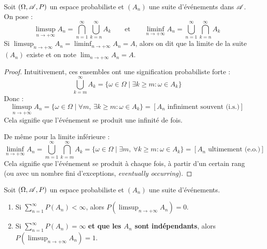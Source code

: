 \begin{proposition}
    Soit $(\Omega, \mathscr{A}, P)$ un espace probabiliste et $(A_n)$ une suite d'événements dans $\mathscr{A}$. On pose :
    \[
    \limsup_{n\to+\infty} A_n = \bigcap_{n=1}^\infty \bigcup_{k = n}^\infty A_k \qquad \text{et} \qquad \liminf_{n\to+\infty} A_n = \bigcup_{n=1}^\infty \bigcap_{k = n}^\infty A_k
    \]
    Si $\limsup_{n\to +\infty}A_n = \liminf_{n\to +\infty}A_n = A$, alors on dit que la limite de la suite $(A_n)$ existe et on note $\lim_{n\to +\infty}A_n = A$.
\end{proposition}

\begin{proof}
   Intuitivement, ces ensembles ont une signification probabiliste forte :
    \[
    \bigcup_{k=m}^{\infty} A_k = \{\omega \in \Omega \mid \exists k \geq m : \omega \in A_k\}
    \]
    Donc :
    \[
    \limsup_{n \to +\infty} A_n = \{\omega \in \Omega \mid \forall m,\ \exists k \geq m : \omega \in A_k\} = [A_n \text{ infiniment souvent (i.s.)}]
    \]
    Cela signifie que l'événement se produit une infinité de fois.
    
    De même pour la limite inférieure :
    \[
    \liminf_{n \to +\infty} A_n = \bigcup_{m=1}^{\infty} \bigcap_{k=m}^{\infty} A_k = \{\omega \in \Omega \mid \exists m,\ \forall k \geq m : \omega \in A_k\} = [A_n \text{ ultimement (e.o.)}]
    \]
    Cela signifie que l'événement se produit à chaque fois, à partir d'un certain rang (ou avec un nombre fini d'exceptions, \textit{eventually occurring}).
\end{proof}

\begin{theoreme}
    Soit $(\Omega, \mathscr{A}, P)$ un espace probabiliste et $(A_n)$ une suite d'événements.
\begin{enumerate}
    \item Si $\displaystyle\sum_{n=1}^{\infty} P(A_n) < \infty$, alors $P\left(\limsup_{n \to +\infty} A_n\right) = 0$.
    \item Si $\displaystyle\sum_{n=1}^{\infty} P(A_n) = \infty$ \textbf{et que les $A_n$ sont indépendants}, alors $P\left(\limsup_{n \to +\infty} A_n\right) = 1$.
\end{enumerate}
\end{theoreme}

